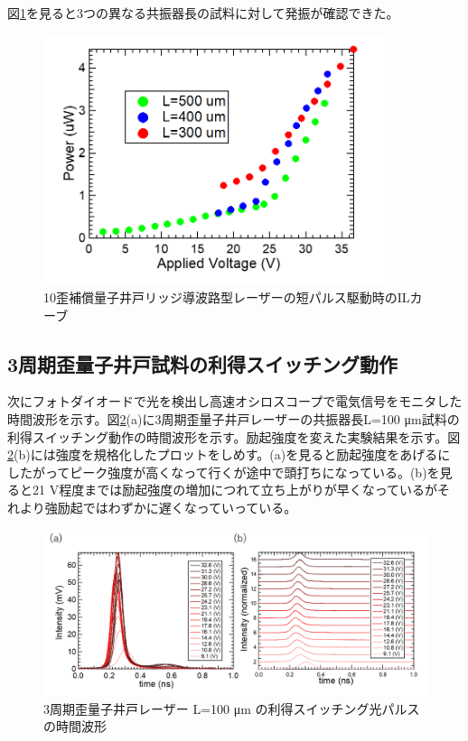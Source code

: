 {図\ref{fig:fig_3_2_10QW_ridge_GS_power}を見ると3つの異なる共振器長の試料に対して発振が確認できた。
\begin{figure}[h]
	\centering
	\includegraphics[width=10cm]{figure/fig_3_2_10QW_ridge_GS_power.png}
		\caption{10歪補償量子井戸リッジ導波路型レーザーの短パルス駆動時のILカーブ}
		\label{fig:fig_3_2_10QW_ridge_GS_power}
\end{figure}
\clearpage
\subsection{3周期歪量子井戸試料の利得スイッチング動作}%
次にフォトダイオードで光を検出し高速オシロスコープで電気信号をモニタした時間波形を示す。図\ref{fig:fig_3_2_3QW_ridge_L100_GS}(a)に3周期歪量子井戸レーザーの共振器長L=100 \si{\micro\metre}試料の利得スイッチング動作の時間波形を示す。励起強度を変えた実験結果を示す。図\ref{fig:fig_3_2_3QW_ridge_L100_GS}(b)には強度を規格化したプロットをしめす。(a)を見ると励起強度をあげるにしたがってピーク強度が高くなって行くが途中で頭打ちになっている。(b)を見ると21 V程度までは励起強度の増加につれて立ち上がりが早くなっているがそれより強励起ではわずかに遅くなっていっている。
\begin{figure}[h]
	\centering
	\includegraphics[width=15cm]{figure/fig_3_2_3QW_ridge_L100_GS.png}
		\caption{3周期歪量子井戸レーザー L=100 \si{\micro\metre} の利得スイッチング光パルスの時間波形}
		\label{fig:fig_3_2_3QW_ridge_L100_GS}
\end{figure}


}
